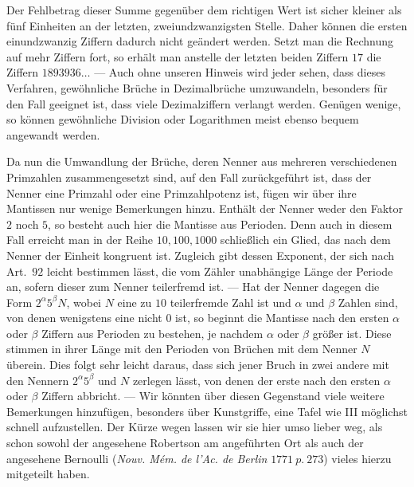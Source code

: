 Der Fehlbetrag dieser Summe gegenüber dem richtigen Wert ist sicher kleiner als fünf Einheiten an der letzten, zweiundzwanzigsten Stelle. Daher können die ersten einundzwanzig Ziffern dadurch nicht geändert werden. Setzt man die Rechnung auf mehr Ziffern fort, so erhält man anstelle der letzten beiden Ziffern \(17\) die Ziffern \(1893936\ldots\) — Auch ohne unseren Hinweis wird jeder sehen, dass dieses Verfahren, gewöhnliche Brüche in Dezimalbrüche umzuwandeln, besonders für den Fall geeignet ist, dass viele Dezimalziffern verlangt werden. Genügen wenige, so können gewöhnliche Division oder Logarithmen meist ebenso bequem angewandt werden.

Da nun die Umwandlung der Brüche, deren Nenner aus mehreren verschiedenen Primzahlen zusammengesetzt sind, auf den Fall zurückgeführt ist, dass der Nenner eine Primzahl oder eine Primzahlpotenz ist, fügen wir über ihre Mantissen nur wenige Bemerkungen hinzu. Enthält der Nenner weder den Faktor \(2\) noch \(5\), so besteht auch hier die Mantisse aus Perioden. Denn auch in diesem Fall erreicht man in der Reihe \(10,\allowbreak 100,\allowbreak 1000\) schließlich ein Glied, das nach dem Nenner der Einheit kongruent ist. Zugleich gibt dessen Exponent, der sich nach Art.\ \(92\) leicht bestimmen lässt, die vom Zähler unabhängige Länge der Periode an, sofern dieser zum Nenner teilerfremd ist. — Hat der Nenner dagegen die Form \(2^\alpha5^\beta N\), wobei \(N\) eine zu \(10\) teilerfremde Zahl ist und \(\alpha\) und \(\beta\) Zahlen sind, von denen wenigstens eine nicht \(0\) ist, so beginnt die Mantisse nach den ersten \(\alpha\) oder \(\beta\) Ziffern aus Perioden zu bestehen, je nachdem \(\alpha\) oder \(\beta\) größer ist. Diese stimmen in ihrer Länge mit den Perioden von Brüchen mit dem Nenner \(N\) überein.
Dies folgt sehr leicht daraus, dass sich jener Bruch in zwei andere mit den Nennern \(2^\alpha5^\beta\) und \(N\) zerlegen lässt, von denen der erste nach den ersten \(\alpha\) oder \(\beta\) Ziffern abbricht. — Wir könnten über diesen Gegenstand viele weitere Bemerkungen hinzufügen, besonders über Kunstgriffe, eine Tafel wie III möglichst schnell aufzustellen. Der Kürze wegen lassen wir sie hier umso lieber weg, als schon sowohl der angesehene Robertson am angeführten Ort als auch der angesehene Bernoulli (\textit{Nouv. Mém. de l'Ac. de Berlin} \(1771\ p.\ 273\)) vieles hierzu mitgeteilt haben.
